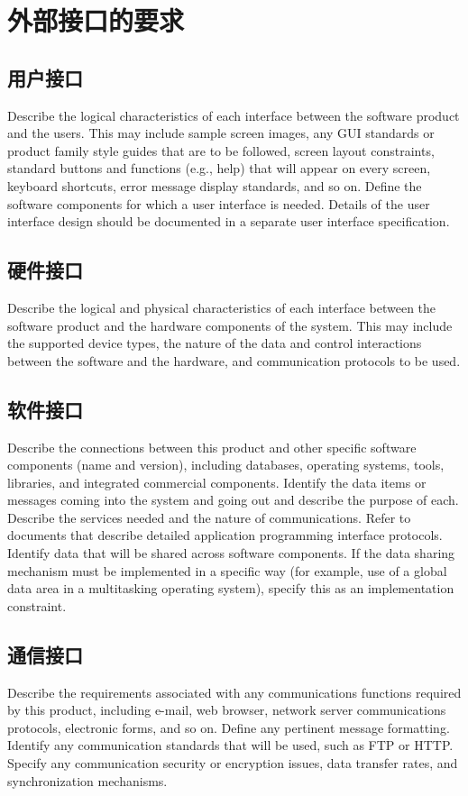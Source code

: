 \documentclass{ctexart}
\begin{document}
\section{外部接口的要求}\label{S:external-interface-requirements}
\subsection{用户接口}
Describe the logical characteristics of each interface between the software 
product and the users. This may include sample screen images, any GUI standards 
or product family style guides that are to be followed, screen layout 
constraints, standard buttons and functions (e.g., help) that will appear on 
every screen, keyboard shortcuts, error message display standards, and so on.  
Define the software components for which a user interface is needed. Details of 
the user interface design should be documented in a separate user interface 
specification.


\subsection{硬件接口}
Describe the logical and physical characteristics of each interface between 
the software product and the hardware components of the system. This may include 
the supported device types, the nature of the data and control interactions 
between the software and the hardware, and communication protocols to be 
used.


\subsection{软件接口}
Describe the connections between this product and other specific software 
components (name and version), including databases, operating systems, tools, 
libraries, and integrated commercial components. Identify the data items or 
messages coming into the system and going out and describe the purpose of each.  
Describe the services needed and the nature of communications. Refer to 
documents that describe detailed application programming interface protocols.  
Identify data that will be shared across software components. If the data 
sharing mechanism must be implemented in a specific way (for example, use of a 
global data area in a multitasking operating system), specify this as an 
implementation constraint.


\subsection{通信接口}
Describe the requirements associated with any communications functions 
required by this product, including e-mail, web browser, network server 
communications protocols, electronic forms, and so on. Define any pertinent 
message formatting. Identify any communication standards that will be used, such 
as FTP or HTTP. Specify any communication security or encryption issues, data 
transfer rates, and synchronization mechanisms.
\end{document}
